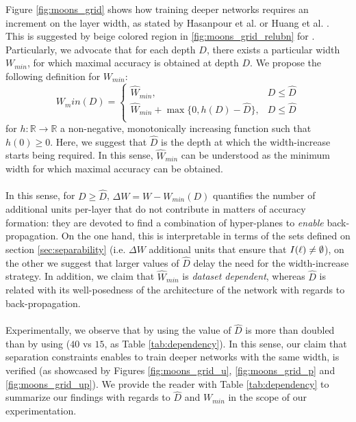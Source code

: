 Figure \ref{fig:moons_grid} shows how training deeper networks requires an increment on the layer width, as stated by Hasanpour et al. \cite{simpnet} or Huang et al. \cite{densenet}. This is suggested by beige colored region in \ref{fig:moons_grid_relubn} for \ReLUBN. Particularly, we advocate that for each depth $D$, there exists a particular width $W_{min}$, for which maximal accuracy is obtained at depth $D$. We propose the following definition for $W_{min}$:
\begin{equation}\label{eq:dependencyWidthDepth}
 W_min(D) = 
 \begin{cases}
 \hat{W}_{min}, & D\leq \hat{D}\\
 \hat{W}_{min}+\max\{0,h(D)-\hat{D}\}, & D\leq \hat{D}\\
 \end{cases}
\end{equation}
for $h:\mathbb{R}\rightarrow\mathbb{R}$ a non-negative, monotonically increasing function such that $h(0)\geq 0$. 
Here, we suggest that $\hat{D}$ is the depth at which the width-increase starts being required. In this sense, $\hat{W}_{min}$ can be understood as the minimum width for which maximal accuracy can be obtained. 
\\\\
In this sense, for $D\geq \hat{D}$, $\Delta{W} = W-W_{min}(D)$ quantifies the number of additional units per-layer that do not contribute in matters of accuracy formation: they are devoted to find a combination of hyper-planes to \emph{enable} back-propagation. On the one hand, this is interpretable in terms of the sets defined on section \ref{sec:separability} (i.e. $\Delta{W}$ additional units that ensure that $I(\ell)\neq\emptyset$), on the other we suggest that larger values of $\hat{D}$ delay the need for the width-increase strategy. In addition, we claim that $\hat{W}_{min}$ is \emph{dataset dependent}, whereas $\hat{D}$ is related with its well-posedness of the architecture of the network with regards to back-propagation.
\\\\
Experimentally, we observe that by using \SepUnitPoint the value of $\hat{D}$ is more than doubled than by using \ReLUBN ($40$ vs $15$, as Table \ref{tab:dependency}). In this sense, our claim  that separation constraints enables to train deeper networks with the same width, is verified (as showcased by Figures \ref{fig:moons_grid_u}, \ref{fig:moons_grid_p} and \ref{fig:moons_grid_up}). We provide the reader with Table \ref{tab:dependency} to summarize our findings with regards to $\hat{D}$ and $W_{min}$ in the scope of our experimentation. 
\\\\

